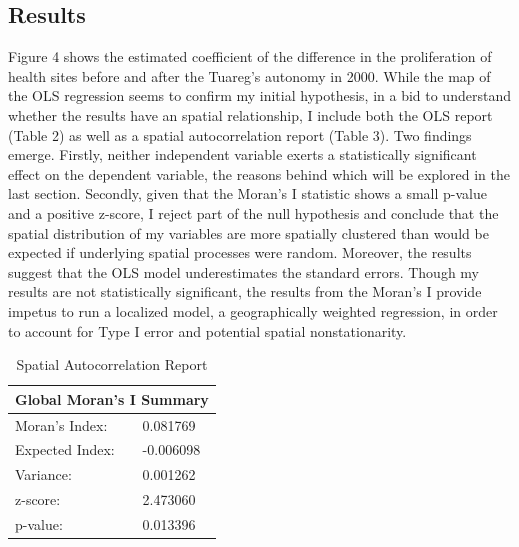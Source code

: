 \documentclass[12pt]{elsarticle}
\begin{document}
\subsection{Results}
Figure 4 shows the estimated coefficient of the difference in the proliferation of health sites before and after the Tuareg's autonomy in 2000. While the map of the OLS regression seems to confirm my initial hypothesis, in a bid to understand whether the results have an spatial relationship, I include both the OLS report (Table 2) as well as a spatial autocorrelation report (Table 3). Two findings emerge. Firstly, neither independent variable exerts a statistically significant effect on the dependent variable, the reasons behind which will be explored in the last section. Secondly, given that the Moran's I statistic shows a small p-value and a positive z-score, I reject part of the null hypothesis and conclude that the spatial distribution of my variables are more spatially clustered than would be expected if underlying spatial processes were random. Moreover, the results suggest that the OLS model underestimates the standard errors. Though my results are not statistically significant, the results from the Moran's I provide impetus to run a localized model, a geographically weighted regression, in order to account for Type I error and potential spatial nonstationarity.

\begin{table}
    \small
\begin{center}
\begin{tabular}{|l|l|}
\hline
\multicolumn{2}{|c|}{Global Moran's I Summary}  \\
\hline
Moran's Index:          &           0.081769    \\
Expected Index:         &	        -0.006098   \\ 
Variance:	            &           0.001262    \\
z-score:	            &           2.473060    \\
p-value:     	        &           0.013396    \\  
\hline
\end{tabular}%
\end{center}
\caption{Spatial Autocorrelation Report}
\label{table:coefficients}
\end{table}
\end{document}
